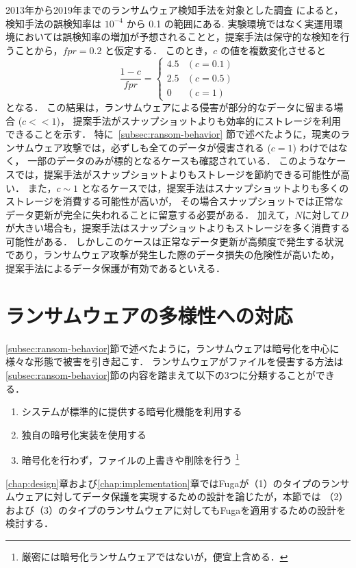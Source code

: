 2013年から2019年までのランサムウェア検知手法を対象とした調査\cite{berrueta2019survey} によると，
検知手法の誤検知率は \(10^{-4}\) から 0.1 の範囲にある.
実験環境ではなく実運用環境においては誤検知率の増加が予想されることと，提案手法は保守的な検知を行うことから，\(fpr = 0.2\) と仮定する．
このとき，\(c\) の値を複数変化させると
\begin{equation}
  \frac{1-c}{fpr} =
  \begin{cases}
    4.5 & (c = 0.1) \\
    2.5 & (c = 0.5) \\
    0   & (c = 1)
  \end{cases}
\end{equation}
となる．
この結果は，ランサムウェアによる侵害が部分的なデータに留まる場合 (\(c << 1\))，
提案手法がスナップショットよりも効率的にストレージを利用できることを示す．
特に~\ref{subsec:ransom-behavior} 節で述べたように，現実のランサムウェア攻撃では，必ずしも全てのデータが侵害される (\(c = 1\)) わけではなく，
一部のデータのみが標的となるケースも確認されている．
このようなケースでは，提案手法がスナップショットよりもストレージを節約できる可能性が高い．
また，\(c \sim 1\) となるケースでは，提案手法はスナップショットよりも多くのストレージを消費する可能性が高いが，
その場合スナップショットでは正常なデータ更新が完全に失われることに留意する必要がある．
加えて，$N$に対して$D$が大きい場合も，提案手法はスナップショットよりもストレージを多く消費する可能性がある．
しかしこのケースは正常なデータ更新が高頻度で発生する状況であり，ランサムウェア攻撃が発生した際のデータ損失の危険性が高いため，
提案手法によるデータ保護が有効であるといえる．



\section{ランサムウェアの多様性への対応}
\ref{subsec:ransom-behavior}節で述べたように，ランサムウェアは暗号化を中心に様々な形態で被害を引き起こす．
ランサムウェアがファイルを侵害する方法は\ref{subsec:ransom-behavior}節の内容を踏まえて以下の3つに分類することができる．
\begin{enumerate}
  \item システムが標準的に提供する暗号化機能を利用する
  \item 独自の暗号化実装を使用する
  \item 暗号化を行わず，ファイルの上書きや削除を行う \footnote{厳密には暗号化ランサムウェアではないが，便宜上含める．}
\end{enumerate}
\ref{chap:design}章および\ref{chap:implementation}章ではFugaが（1）のタイプのランサムウェアに対してデータ保護を実現するための設計を論じたが，本節では
（2）および（3）のタイプのランサムウェアに対してもFugaを適用するための設計を検討する．

